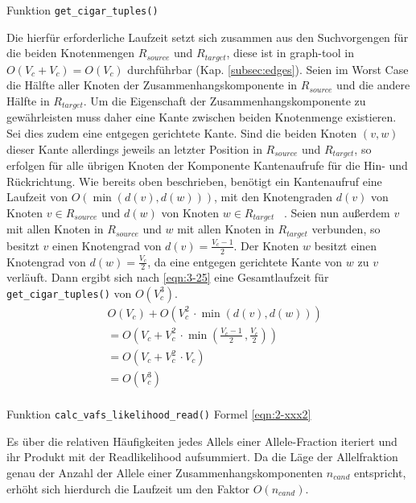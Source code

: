 Funktion \lstinline|get_cigar_tuples()|

Die hierfür erforderliche Laufzeit setzt sich zusammen aus den Suchvorgengen für die beiden Knotenmengen $ R_{source} $ und $ R_{target} $, diese ist in graph-tool in $O(V_{c} + V_{c}) = O(V_{c})$ durchführbar (Kap. \ref{subsec:edges}). Seien im Worst Case die Hälfte aller Knoten der Zusammenhangskomponente in $ R_{source} $ und die andere Hälfte in $ R_{target} $. Um die Eigenschaft der Zusammenhangskomponente zu gewährleisten muss daher eine Kante zwischen beiden Knotenmenge existieren. Sei dies zudem eine entgegen gerichtete Kante. Sind die beiden Knoten $ (v, w) $ dieser Kante allerdings jeweils an letzter Position in $ R_{source} $ und $ R_{target} $, so erfolgen für alle übrigen Knoten der Komponente Kantenaufrufe für die Hin- und Rückrichtung. Wie bereits oben beschrieben, benötigt ein Kantenaufruf eine Laufzeit von $ O(\min (d(v), d(w)))$, mit den Knotengraden $d(v) $ von Knoten $v \in R_{source}$ und $ d(w) $ von Knoten $ w \in R_{target} $ ~\cite{docs_graph_tool}. Seien nun außerdem $ v $ mit allen Knoten in $ R_{source} $ und $ w $ mit allen Knoten in $ R_{target} $ verbunden, so besitzt $v$ einen Knotengrad von $ d(v) = \frac{V_{c}-1}{2} $. Der Knoten $ w $ besitzt einen Knotengrad von $ d(w) = \frac{V_{c}}{2} $, da eine entgegen gerichtete Kante von $w$ zu $v$ verläuft. Dann ergibt sich nach \eqref{eqn:3-25} eine Gesamtlaufzeit für \lstinline|get_cigar_tuples()| von $ O(V_{c}^3) $. \\

\begin{equation} \label{eqn:3-25}
\tag{3-25}
\begin{aligned}
&\ {} O(V_{c}) + O(V_{c}^2 \, \cdotp \min (d(v), d(w)))  \\
& \ = O\left( V_{c} + V_{c}^2 \, \cdotp \min \left( \frac{V_{c}-1}{2}\,, \frac{V_{c}}{2}\right) \right) \\
&\ = O(V_{c} + V_{c}^2 \, \cdotp V_{c}) \\
&\ = O(V_{c}^3) \\
\end{aligned}
\end{equation}

Funktion \lstinline|calc_vafs_likelihood_read()| Formel \eqref{eqn:2-xxx2} 

Es über die relativen Häufigkeiten jedes Allels einer Allele-Fraction iteriert und ihr Produkt mit der Readlikelihood aufsummiert. Da die Läge der Allelfraktion genau der Anzahl der Allele einer Zusammenhangskomponenten $ n_{cand} $ entspricht, erhöht sich hierdurch die Laufzeit um den Faktor $ O(n_{cand}) $.

